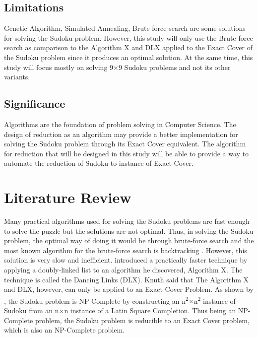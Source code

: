 \documentclass[a4paper,oneside,11pt]{report}
\begin{document}
\section{Limitations}
Genetic Algorithm, Simulated Annealing, Brute-force search are some solutions for solving the Sudoku problem. However, this study will only use the Brute-force search as comparison to the Algorithm X and DLX applied to the Exact Cover of the Sudoku problem since it produces an optimal solution. At the same time, this study will focus mostly on solving 9$\times$9 Sudoku problems and not its other variants.

\section{Significance}
Algorithms are the foundation of problem solving in Computer Science. The design of reduction as an algorithm may provide a better implementation for solving the Sudoku problem through its Exact Cover equivalent. The algorithm for reduction that will be designed in this study will be able to provide a way to automate the reduction of Sudoku to instance of Exact Cover.


\chapter{Literature Review}
Many practical algorithms used for solving the Sudoku problems are fast enough to solve the puzzle but the solutions are not optimal. Thus, in solving the Sudoku problem, the optimal way of doing it would be through brute-force search and the most known algorithm for the brute-force search is backtracking \cite{Cazenave}. However, this solution is very slow and inefficient. \cite{Knuth} introduced a practically faster technique by applying a doubly-linked list to an algorithm he discovered, Algorithm X. The technique is called the Dancing Links (DLX). Knuth said that The Algorithm X and DLX, however, can only be applied to an Exact Cover Problem. As shown by \cite{Yato}, the Sudoku problem is NP-Complete by constructing an n\textsuperscript{2}$\times$n\textsuperscript{2} instance of Sudoku from an n$\times$n instance of a Latin Square Completion. Thus being an NP-Complete problem, the Sudoku problem is reducible to an Exact Cover problem, which is also an NP-Complete problem.\\
\end{document}
